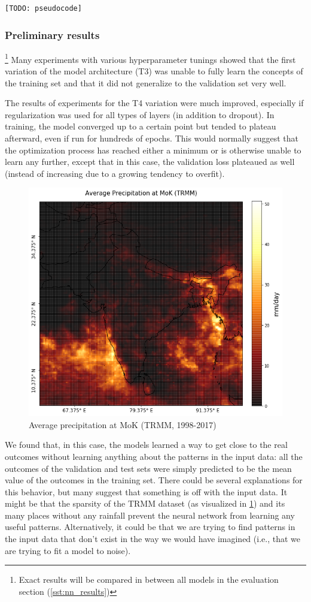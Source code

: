 \begin{figure}[h]
\end{figure}

\begin{lstlisting}[language=Python]
  [TODO: pseudocode]
\end{lstlisting}

\subsubsection{Preliminary results}{\footnote{Exact results will be compared in between all models in the evaluation section (\cref{sst:nn_results})}}
\label{ssst:nn_t3_results}
Many experiments with various hyperparameter tunings showed that the first variation of the model architecture (T3) was unable to fully learn the concepts of the training set and that it did not generalize to the validation set very well.

The results of experiments for the T4 variation were much improved, especially if regularization was used for all types of layers (in addition to dropout). In training, the model converged up to a certain point but tended to plateau afterward, even if run for hundreds of epochs. This would normally suggest that the optimization process has reached either a minimum or is otherwise unable to learn any further, except that in this case, the validation loss plateaued as well (instead of increasing due to a growing tendency to overfit).

\begin{figure}[h]
  \centering
  \includegraphics[width=0.4\linewidth]{./99_appendix/img/prec_avg_onset}
  \caption{Average precipitation at MoK (TRMM, 1998-2017)}
  \label{fig:trmm_prec_onset}
\end{figure}

We found that, in this case, the models learned a way to get close to the real outcomes without learning anything about the patterns in the input data: all the outcomes of the validation and test sets were simply predicted to be the mean value of the outcomes in the training set. There could be several explanations for this behavior, but many suggest that something is off with the input data. It might be that the sparsity of the TRMM dataset (as visualized in \cref{fig:trmm_prec_onset}) and its many places without any rainfall prevent the neural network from learning any useful patterns. Alternatively, it could be that we are trying to find patterns in the input data that don't exist in the way we would have imagined (i.e., that we are trying to fit a model to noise).


